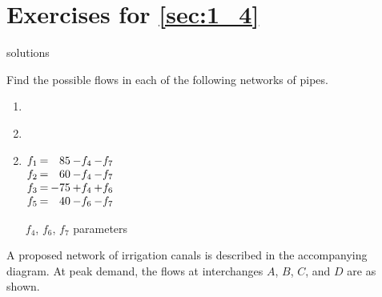 \section*{Exercises for \ref{sec:1_4}}

\begin{Filesave}{solutions}
\end{Filesave}

\begin{multicols}{2}

\begin{ex}\label{ex:pipenetwork}
Find the possible flows in each of the following networks of pipes.
\begin{enumerate}[label={\alph*.}]
\item \hfill
\begin{figure}[H]
\centering

\end{figure}

\item \hfill
\begin{figure}[H]
\centering

\end{figure}
\end{enumerate}
\begin{sol}
\begin{enumerate}[label={\alph*.}]
\setcounter{enumi}{1}
\item  
$\arraycolsep=1pt
\begin{array}[t]{rcrrr}
	f_1 & = &  85 & - f_4 & - f_7 \\
	f_2 & = &  60 & - f_4 & - f_7 \\
	f_3 & = & -75 & + f_4 & + f_6 \\
	f_5 & = &  40 & - f_6 & - f_7 \\
\end{array}$

$f_4$, $f_6$, $f_7$ parameters

\end{enumerate}
\end{sol}
\end{ex}

\begin{ex}
A proposed network of irrigation canals is described in the accompanying diagram. At peak demand, the flows at interchanges $A$, $B$, $C$, and $D$ are as shown.


\end{ex}
\end{multicols}
